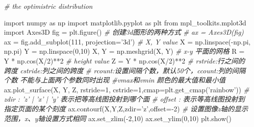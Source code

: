 \documentclass[11pt]{article}
\newenvironment{Shaded}{}{}
\newcommand{\DecValTok}[1]{\textcolor[rgb]{0.25,0.63,0.44}{{#1}}}
\newcommand{\StringTok}[1]{\textcolor[rgb]{0.25,0.44,0.63}{{#1}}}
\newcommand{\CommentTok}[1]{\textcolor[rgb]{0.38,0.63,0.69}{\textit{{#1}}}}
\newcommand{\NormalTok}[1]{{#1}}
\newcommand{\ImportTok}[1]{{#1}}
\newcommand{\OperatorTok}[1]{\textcolor[rgb]{0.40,0.40,0.40}{{#1}}}
\begin{document}
\begin{Shaded}
\begin{Highlighting}[]
\CommentTok{# the optimistric distribution}

\ImportTok{import}\NormalTok{ numpy }\ImportTok{as}\NormalTok{ np  }
\ImportTok{import}\NormalTok{ matplotlib.pyplot }\ImportTok{as}\NormalTok{ plt  }
\ImportTok{from}\NormalTok{ mpl_toolkits.mplot3d }\ImportTok{import}\NormalTok{ Axes3D  }
\NormalTok{fig }\OperatorTok{=}\NormalTok{ plt.figure()  }
\CommentTok{# 创建3d图形的两种方式  }
\CommentTok{# ax = Axes3D(fig)  }
\NormalTok{ax }\OperatorTok{=}\NormalTok{ fig.add_subplot(}\DecValTok{111}\NormalTok{, projection}\OperatorTok{=}\StringTok{'3d'}\NormalTok{)  }
\CommentTok{# X, Y value  }
\NormalTok{X }\OperatorTok{=}\NormalTok{ np.linspace(}\OperatorTok{-}\NormalTok{np.pi, np.pi)  }
\NormalTok{Y }\OperatorTok{=}\NormalTok{ np.linspace(}\DecValTok{0}\NormalTok{,}\DecValTok{10}\NormalTok{)}
\NormalTok{X, Y }\OperatorTok{=}\NormalTok{ np.meshgrid(X, Y)    }\CommentTok{# x-y 平面的网格  }
\NormalTok{R }\OperatorTok{=}\NormalTok{ Y }\OperatorTok{*}\NormalTok{ np.cos(X}\OperatorTok{/}\DecValTok{2}\NormalTok{)}\OperatorTok{**}\DecValTok{2}  
\CommentTok{# height value  }
\NormalTok{Z }\OperatorTok{=}\NormalTok{ Y }\OperatorTok{*}\NormalTok{ np.cos(X}\OperatorTok{/}\DecValTok{2}\NormalTok{)}\OperatorTok{**}\DecValTok{2} 
\CommentTok{# rstride:行之间的跨度  cstride:列之间的跨度  }
\CommentTok{# rcount:设置间隔个数，默认50个，ccount:列的间隔个数  不能与上面两个参数同时出现  }
\CommentTok{#vmax和vmin  颜色的最大值和最小值  }
\NormalTok{ax.plot_surface(X, Y, Z, rstride}\OperatorTok{=}\DecValTok{1}\NormalTok{, cstride}\OperatorTok{=}\DecValTok{1}\NormalTok{,cmap}\OperatorTok{=}\NormalTok{plt.get_cmap(}\StringTok{'rainbow'}\NormalTok{))  }
\CommentTok{# zdir : 'z' | 'x' | 'y' 表示把等高线图投射到哪个面  }
\CommentTok{# offset : 表示等高线图投射到指定页面的某个刻度  }
\NormalTok{ax.contourf(X,Y,Z,zdir}\OperatorTok{=}\StringTok{'z'}\NormalTok{,offset}\OperatorTok{=-}\DecValTok{2}\NormalTok{)  }
\CommentTok{# 设置图像z轴的显示范围，x、y轴设置方式相同  }
\NormalTok{ax.set_zlim(}\OperatorTok{-}\DecValTok{2}\NormalTok{,}\DecValTok{10}\NormalTok{) }
\NormalTok{ax.set_ylim(}\DecValTok{0}\NormalTok{,}\DecValTok{10}\NormalTok{) }
\NormalTok{plt.show()}
\end{Highlighting}
\end{Shaded}
\end{document}
